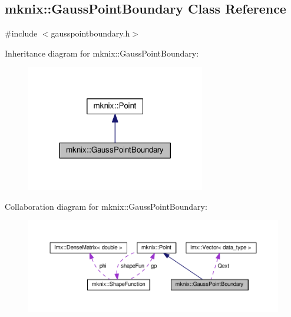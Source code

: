 \hypertarget{classmknix_1_1_gauss_point_boundary}{}\subsection{mknix\+:\+:Gauss\+Point\+Boundary Class Reference}
\label{classmknix_1_1_gauss_point_boundary}


{\ttfamily \#include $<$gausspointboundary.\+h$>$}



Inheritance diagram for mknix\+:\+:Gauss\+Point\+Boundary\+:\nopagebreak
\begin{figure}[H]
\begin{center}
\leavevmode
\includegraphics[width=221pt]{d5/d17/classmknix_1_1_gauss_point_boundary__inherit__graph}
\end{center}
\end{figure}


Collaboration diagram for mknix\+:\+:Gauss\+Point\+Boundary\+:\nopagebreak
\begin{figure}[H]
\begin{center}
\leavevmode
\includegraphics[width=350pt]{d1/d47/classmknix_1_1_gauss_point_boundary__coll__graph}
\end{center}
\end{figure}
